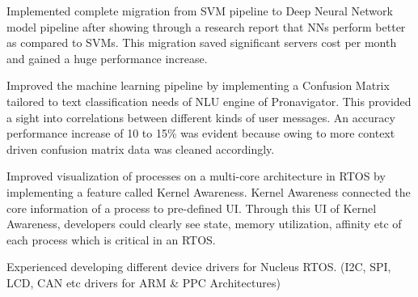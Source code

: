 \documentclass[]{deedy-resume-openfont}
\begin{document}
\begin{minipage}[t]{0.63\textwidth}
\begin{tightemize}
\item Implemented complete migration from SVM pipeline to Deep Neural Network model pipeline after showing through a research report that NNs perform better as compared to SVMs.  This migration saved significant servers cost per month and gained a huge performance increase. 

\item Improved the machine learning pipeline by implementing a Confusion Matrix tailored to text classification needs of NLU engine of Pronavigator. This provided a sight into correlations between different kinds of user messages. An accuracy performance increase of 10 to 15\% was evident because owing to more context driven confusion matrix data was cleaned accordingly.

\end{tightemize}
\sectionsep


\begin{tightemize}

\item Improved visualization of processes on a multi-core architecture in RTOS by implementing a feature called Kernel Awareness. Kernel Awareness connected the core information of a process to pre-defined UI. Through this UI of Kernel Awareness, developers could clearly see state, memory utilization, affinity etc of each process which is critical in an RTOS.

\item Experienced developing different device drivers for Nucleus RTOS. (I2C, SPI, LCD, CAN etc drivers for ARM \& PPC Architectures)

\end{tightemize}
\sectionsep



\end{minipage}
\end{document}
